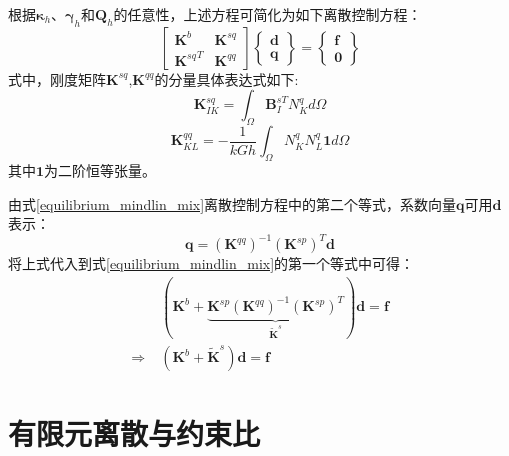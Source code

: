 根据$\pmb\kappa_h$、$\pmb\gamma_h$和$\pmb Q_h$的任意性，上述方程可简化为如下离散控制方程：
\begin{equation} \label{equilibrium_mindlin_mix}
    \begin{bmatrix}\pmb{K}^{b}&\pmb{K}^{sq}\\{\pmb{K}^{sq}}^T&\pmb{K}^{qq}\end{bmatrix}
    \begin{Bmatrix}\pmb{d}\\\pmb{q}\end{Bmatrix}=
    \begin{Bmatrix}\pmb{f}\\\pmb{0}\end{Bmatrix}
\end{equation}
式中，刚度矩阵$\boldsymbol K^{sq}$,$\boldsymbol K^{qq}$的分量具体表达式如下:
\begin{equation} 
    \boldsymbol K^{sq}_{IK} = \int_\Omega \boldsymbol B^{sT}_I N^q_K d\Omega
\end{equation} 
\begin{equation} 
    \boldsymbol K^{qq}_{KL} = -\frac{1}{kGh} \int_\Omega N^q_K N^q_L \boldsymbol 1 d\Omega
\end{equation}
其中$\boldsymbol 1$为二阶恒等张量。

由式\eqref{equilibrium_mindlin_mix}离散控制方程中的第二个等式，系数向量$\boldsymbol q$可用$\boldsymbol d$表示：
\begin{equation}
    \boldsymbol q =(\boldsymbol K^{qq})^{-1} (\boldsymbol K^{sp})^T \boldsymbol d
\end{equation}
将上式代入到式\eqref{equilibrium_mindlin_mix}的第一个等式中可得：
\begin{equation}\label{equilibrium_mindlin_projection}
    \begin{split}
        &(\boldsymbol K^{b} + \underbrace{\boldsymbol K^{sp}(\boldsymbol K^{qq})^{-1}(\boldsymbol K^{sp})^{T}}_{\tilde{\boldsymbol K}^s}) \boldsymbol d = \boldsymbol f \\
        \Rightarrow\;& (\boldsymbol K^b + \tilde{\boldsymbol K}^s)\boldsymbol d = \boldsymbol f
    \end{split}
\end{equation}

\section{有限元离散与约束比}      
